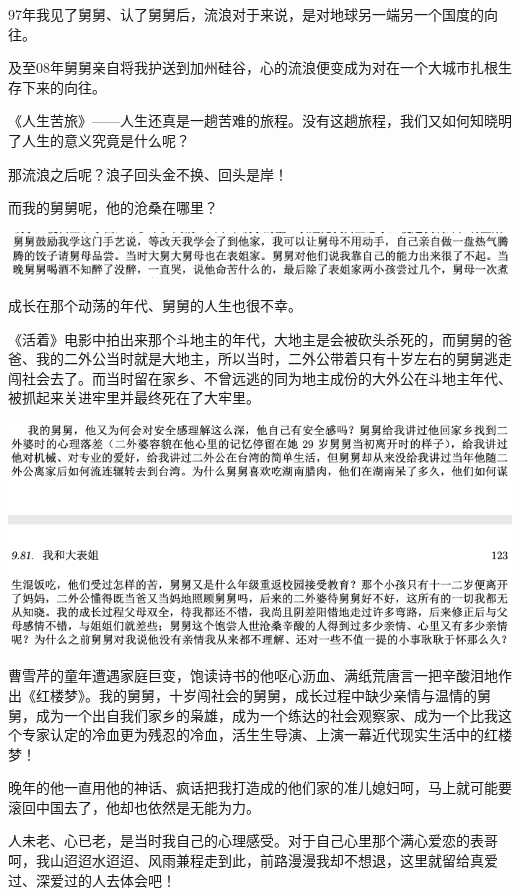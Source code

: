 \documentclass[9pt, b5paper]{article}
\begin{document}
97年我见了舅舅、认了舅舅后，流浪对于来说，是对地球另一端另一个国度的向往。

及至08年舅舅亲自将我护送到加州硅谷，心的流浪便变成为对在一个大城市扎根生存下来的向往。

《人生苦旅》——人生还真是一趟苦难的旅程。没有这趟旅程，我们又如何知晓明了人生的意义究竟是什么呢？

那流浪之后呢？浪子回头金不换、回头是岸！

而我的舅舅呢，他的沧桑在哪里？

\begin{center}
\includegraphics[width=.9\linewidth]{./pic/p1p34-1.png}
\end{center}

成长在那个动荡的年代、舅舅的人生也很不幸。

《活着》电影中拍出来那个斗地主的年代，大地主是会被砍头杀死的，而舅舅的爸爸、我的二外公当时就是大地主，所以当时，二外公带着只有十岁左右的舅舅逃走闯社会去了。而当时留在家乡、不曾远逃的同为地主成份的大外公在斗地主年代、被抓起来关进牢里并最终死在了大牢里。

\begin{center}
\includegraphics[width=.9\linewidth]{./pic/p1p123-4.png}
\end{center}

曹雪芹的童年遭遇家庭巨变，饱读诗书的他呕心沥血、满纸荒唐言一把辛酸泪地作出《红楼梦》。我的舅舅，十岁闯社会的舅舅，成长过程中缺少亲情与温情的舅舅，成为一个出自我们家乡的枭雄，成为一个练达的社会观察家、成为一个比我这个专家认定的冷血更为残忍的冷血，活生生导演、上演一幕近代现实生活中的红楼梦！

晚年的他一直用他的神话、疯话把我打造成的他们家的准儿媳妇呵，马上就可能要滚回中国去了，他却也依然是无能为力。

人未老、心已老，是当时我自己的心理感受。对于自己心里那个满心爱恋的表哥呵，我山迢迢水迢迢、风雨兼程走到此，前路漫漫我却不想退，这里就留给真爱过、深爱过的人去体会吧！
\end{document}
